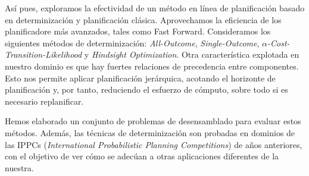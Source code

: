 Así pues, exploramos la efectividad de un método en línea de planificación
basado en determinización y planificación clásica. Aprovechamos la eficiencia
de los planificadore más avanzados, tales como Fast Forward. Consideramos
los siguientes métodos de determinización: \emph{All-Outcome}, \emph{Single-Outcome},
\emph{$ \alpha $-Cost-Transition-Likelihood} y \emph{Hindsight Optimization}. Otra
característica explotada en nuestro dominio es que hay fuertes relaciones de
precedencia entre componentes. Esto nos permite aplicar planificación jerárquica,
acotando el horizonte de planificación y, por tanto, reduciendo el esfuerzo
de cómputo, sobre todo si es necesario replanificar.

Hemos elaborado un conjunto de problemas de desensamblado para evaluar estos
métodos. Además, las técnicas de determinización son probadas en dominios
de las IPPCs (\emph{International Probabilistic Planning Competitions}) de años
anteriores, con el objetivo de ver cómo se adecúan a otras aplicaciones
diferentes de la nuestra.
